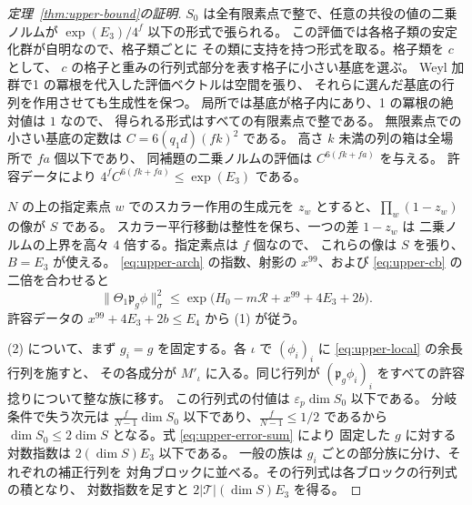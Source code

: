\begin{proof}[定理~\ref{thm:upper-bound}の証明]
\(S_0\) は全有限素点で整で、任意の共役の値の二乗ノルムが
\(\exp(E_3)/4^f\) 以下の形式で張られる。
この評価では各格子類の安定化群が自明なので、格子類ごとに
その類に支持を持つ形式を取る。格子類を \(c\) として、
\(c\) の格子と重みの行列式部分を表す格子に小さい基底を選ぶ。
Weyl 加群で1 の冪根を代入した評価ベクトルは空間を張り、
それらに選んだ基底の行列を作用させても生成性を保つ。
局所では基底が格子内にあり、1 の冪根の絶対値は \(1\) なので、
得られる形式はすべての有限素点で整である。
無限素点での小さい基底の定数は \(C=6(q_1d)(fk)^2\) である。
高さ \(k\) 未満の列の箱は全場所で \(fa\) 個以下であり、
同補題の二乗ノルムの評価は \(C^{6(fk+fa)}\) を与える。
許容データにより \(4^f C^{6(fk+fa)}\le \exp(E_3)\) である。

\(N\) の上の指定素点 \(w\) でのスカラー作用の生成元を \(z_w\)
とすると、\(\prod_w(1-z_w)\) の像が \(S\) である。
スカラー平行移動は整性を保ち、一つの差 \(1-z_w\) は
二乗ノルムの上界を高々 \(4\) 倍する。指定素点は \(f\) 個なので、
これらの像は \(S\) を張り、\(B=E_3\) が使える。
\eqref{eq:upper-arch} の指数、射影の \(x^{99}\)、および
\eqref{eq:upper-cb} の二倍を合わせると
\[
 \|\Theta_1\mathfrak p_g\phi\|_\sigma^2
 \le \exp\bigl(H_0-m\mathcal R+x^{99}+4E_3+2b\bigr).
\]
許容データの \(x^{99}+4E_3+2b\le E_4\) から (1) が従う。

(2) について、まず \(g_i=g\) を固定する。各 \(\iota\) で
\((\phi_i)_i\) に \eqref{eq:upper-local} の余長行列を施すと、
その各成分が \(M'_\iota\) に入る。同じ行列が
\((\mathfrak p_g\phi_i)_i\) をすべての許容捻りについて整な族に移す。
この行列式の付値は \(\varepsilon_p\dim S_0\) 以下である。
分岐条件で失う次元は
\(\frac{f}{N-1}\dim S_0\) 以下であり、\(\frac{f}{N-1}\le 1/2\) であるから
\(\dim S_0\le2\dim S\) となる。式 \eqref{eq:upper-error-sum} により
固定した \(g\) に対する対数指数は \(2(\dim S)E_3\) 以下である。
一般の族は \(g_i\) ごとの部分族に分け、それぞれの補正行列を
対角ブロックに並べる。その行列式は各ブロックの行列式の積となり、
対数指数を足すと \(2|\mathcal T|(\dim S)E_3\) を得る。
\end{proof}
